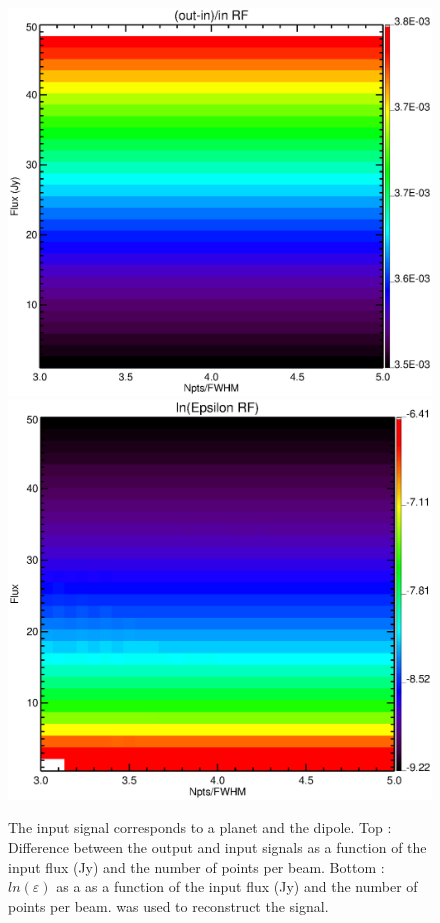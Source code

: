 \begin{figure}[h]
\center
	\includegraphics[scale=0.5]{Figures/diff_rf_planet_dipole.eps}
	\includegraphics[scale=0.5]{Figures/epsilon_rf_planet_dipole.eps}
	\caption{The input signal corresponds to a planet and the dipole. Top : Difference between the output and input signals as a function of the input flux (Jy) and the number of points per beam. Bottom : $ln(\varepsilon)$ as a as a function of the input flux (Jy) and the number of points per beam. \rf was used to reconstruct the signal.}
	\label{fig:epsilon-rf-planet-dipole}
\end{figure}

